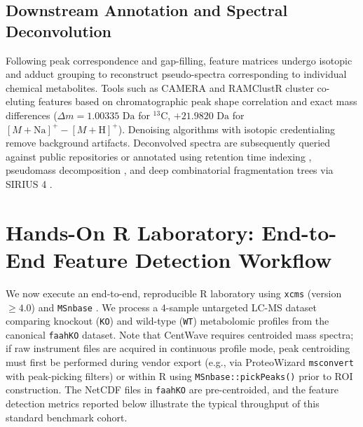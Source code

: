 \documentclass[11pt,twoside,openright]{book}
\begin{document}
\subsection{Downstream Annotation and Spectral Deconvolution}

Following peak correspondence and gap-filling, feature matrices undergo isotopic and adduct grouping to reconstruct pseudo-spectra corresponding to individual chemical metabolites. Tools such as CAMERA \cite{kuhl2012camera} and RAMClustR \cite{broeckling2014ramclustr} cluster co-eluting features based on chromatographic peak shape correlation and exact mass differences ($\Delta m = 1.00335\text{ Da}$ for $^{13}\text{C}$, $+21.9820\text{ Da}$ for $[M+\text{Na}]^+ - [M+\text{H}]^+$). Denoising algorithms with isotopic credentialing \cite{huan2015denoising} remove background artifacts. Deconvolved spectra are subsequently queried against public repositories or annotated using retention time indexing \cite{domingo2018automated}, pseudomass decomposition \cite{stravs2013automatic}, and deep combinatorial fragmentation trees via SIRIUS 4 \cite{duhrkop2019sirius}.

\section{Hands-On R Laboratory: End-to-End Feature Detection Workflow}

We now execute an end-to-end, reproducible R laboratory using \texttt{xcms} (version $\ge 4.0$) and \texttt{MSnbase} \cite{gatto2012msnbase}. We process a 4-sample untargeted LC-MS dataset comparing knockout (\texttt{KO}) and wild-type (\texttt{WT}) metabolomic profiles from the canonical \texttt{faahKO} dataset. Note that CentWave requires centroided mass spectra; if raw instrument files are acquired in continuous profile mode, peak centroiding must first be performed during vendor export (e.g., via ProteoWizard \texttt{msconvert} with peak-picking filters) or within R using \texttt{MSnbase::pickPeaks()} prior to ROI construction. The NetCDF files in \texttt{faahKO} are pre-centroided, and the feature detection metrics reported below illustrate the typical throughput of this standard benchmark cohort.
\end{document}
